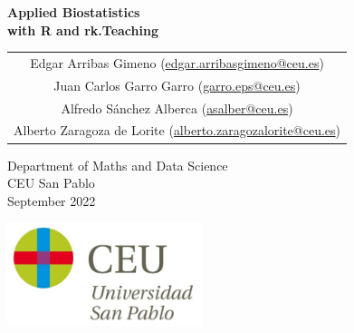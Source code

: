 \begin{titlepage}
\thispagestyle{empty}
\vspace*{7cm}
\par

\begin{center}
\normalfont\fontsize{30}{30}\selectfont
{\bfseries \color{blueceu}Applied Biostatistics\\ with R and rk.Teaching}
\end{center}
\vspace{1cm}

\begin{center}
\Large
\begin{tabular}{c}
Edgar Arribas Gimeno (\url{edgar.arribasgimeno@ceu.es})\\
Juan Carlos Garro Garro (\url{garro.eps@ceu.es})\\
Alfredo Sánchez Alberca (\url{asalber@ceu.es})\\
Alberto Zaragoza de Lorite (\url{alberto.zaragozalorite@ceu.es})
\end{tabular}

\medskip 
Department of Maths and Data Science\\ CEU San Pablo\\[1cm]
\medskip 
September 2022

\vspace{1cm}
\includegraphics[height=3cm]{img/logo_uspceu}
\end{center}
\vfill
\end{titlepage}